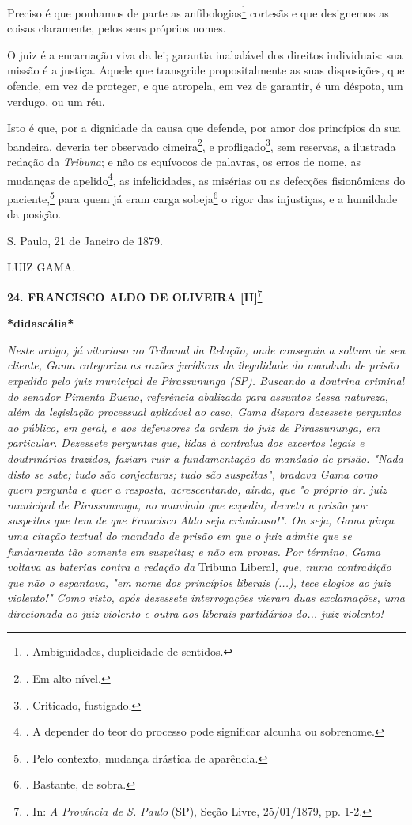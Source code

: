 Preciso é que ponhamos de parte as anfibologias\footnote{. Ambiguidades,
  duplicidade de sentidos.} cortesãs e que designemos as coisas
claramente, pelos seus próprios nomes.

O juiz é a encarnação viva da lei; garantia inabalável dos direitos
individuais: sua missão é a justiça. Aquele que transgride
propositalmente as suas disposições, que ofende, em vez de proteger, e
que atropela, em vez de garantir, é um déspota, um verdugo, ou um réu.

Isto é que, por a dignidade da causa que defende, por amor dos
princípios da sua bandeira, deveria ter observado cimeira\footnote{. Em
  alto nível.}, e profligado\footnote{. Criticado, fustigado.}, sem
reservas, a ilustrada redação da \emph{Tribuna}; e não os equívocos de
palavras, os erros de nome, as mudanças de apelido\footnote{. A depender
  do teor do processo pode significar alcunha ou sobrenome.}, as
infelicidades, as misérias ou as defecções fisionômicas do
paciente,\footnote{. Pelo contexto, mudança drástica de aparência.} para
quem já eram carga sobeja\footnote{. Bastante, de sobra.}
\protect\hypertarget{Secao_Sem_Titulo-32}{}{}o rigor das injustiças, e a
humildade da posição.

S. Paulo, 21 de Janeiro de 1879.

LUIZ GAMA.

\textbf{24. FRANCISCO ALDO DE OLIVEIRA {[}II{]}}\footnote{. In: \emph{A
  Província de S. Paulo} (SP), Seção Livre, 25/01/1879, pp. 1-2.}

\textbf{*didascália*}

\emph{Neste artigo, já vitorioso no Tribunal da Relação, onde conseguiu
a soltura de seu cliente, Gama categoriza as razões jurídicas da
ilegalidade do mandado de prisão expedido pelo juiz municipal de
Pirassununga (SP). Buscando a doutrina criminal do senador Pimenta
Bueno, referência abalizada para assuntos dessa natureza, além da
legislação processual aplicável ao caso, Gama dispara dezessete
perguntas ao público, em geral, e aos defensores da ordem do juiz de
Pirassununga, em particular. Dezessete perguntas que, lidas à contraluz
dos excertos legais e doutrinários trazidos, faziam ruir a fundamentação
do mandado de prisão. "Nada disto se sabe; tudo são conjecturas; tudo
são suspeitas", bradava Gama como quem pergunta e quer a resposta,
acrescentando, ainda, que "o próprio dr. juiz municipal de Pirassununga,
no mandado que expediu, decreta a prisão por suspeitas que tem de que
Francisco Aldo seja criminoso!". Ou seja, Gama pinça uma citação textual
do mandado de prisão em que o juiz admite que se fundamenta tão somente
em suspeitas; e não em provas. Por término, Gama voltava as baterias
contra a redação da} Tribuna Liberal\emph{, que, numa contradição que
não o espantava, "em nome dos princípios liberais (...), tece elogios ao
juiz violento!" Como visto, após dezessete interrogações vieram duas
exclamações, uma direcionada ao juiz violento e outra aos liberais
partidários do... juiz violento! }

